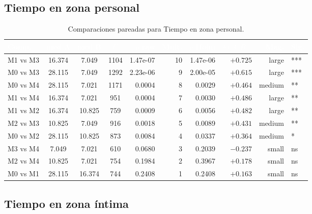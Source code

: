 \documentclass[12pt,a4paper,oneside]{book}
\begin{document}
\subsection{Tiempo en zona personal}

\begin{table}[H]
\centering
\small
\caption{Comparaciones pareadas para Tiempo en zona personal.}
\renewcommand{\arraystretch}{1.15}
\begin{tabular}{lcccrrrrrl}
\toprule
\rowcolor{primary}
\textcolor{white}{\textbf{Comp.}} & \textcolor{white}{\textbf{med A}} & \textcolor{white}{\textbf{med B}} & \textcolor{white}{\textbf{$U$}} & \textcolor{white}{\textbf{$p$ raw}} & \textcolor{white}{\textbf{Mult.}} & \textcolor{white}{\textbf{$p$ Holm}} & \textcolor{white}{\textbf{$\delta(A,B)$}} & \textcolor{white}{\textbf{Mag.}} & \textcolor{white}{\textbf{Sig.}} \\
\midrule
M1 vs M3 & 16.374 & 7.049 & 1104 & 1.47e-07 & 10 & 1.47e-06 & $+0.725$ & large & *** \\
M0 vs M3 & 28.115 & 7.049 & 1292 & 2.23e-06 & 9 & 2.00e-05 & $+0.615$ & large & *** \\
M0 vs M4 & 28.115 & 7.021 & 1171 & 0.0004 & 8 & 0.0029 & $+0.464$ & medium & ** \\
M1 vs M4 & 16.374 & 7.021 & 951 & 0.0004 & 7 & 0.0030 & $+0.486$ & large & ** \\
M1 vs M2 & 16.374 & 10.825 & 759 & 0.0009 & 6 & 0.0056 & $+0.482$ & large & ** \\
M2 vs M3 & 10.825 & 7.049 & 916 & 0.0018 & 5 & 0.0089 & $+0.431$ & medium & ** \\
M0 vs M2 & 28.115 & 10.825 & 873 & 0.0084 & 4 & 0.0337 & $+0.364$ & medium & * \\
M3 vs M4 & 7.049 & 7.021 & 610 & 0.0680 & 3 & 0.2039 & $-0.237$ & small & ns \\
M2 vs M4 & 10.825 & 7.021 & 754 & 0.1984 & 2 & 0.3967 & $+0.178$ & small & ns \\
M0 vs M1 & 28.115 & 16.374 & 744 & 0.2408 & 1 & 0.2408 & $+0.163$ & small & ns \\
\bottomrule
\end{tabular}
\end{table}

\subsection{Tiempo en zona íntima}
\end{document}
